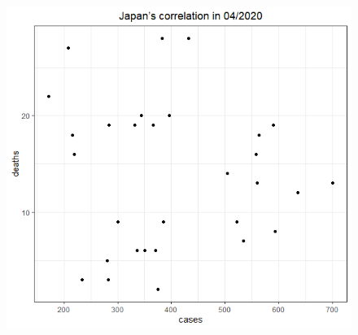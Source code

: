 \documentclass[english,10pt,table]{beamer}
\begin{document}
{\begin{figure}[H]
\begin{center}
        \includegraphics[scale = 0.2]{ix/ix.2/JPN_04_2020.png}
        

\end{center}
\end{figure}}
\end{document}
